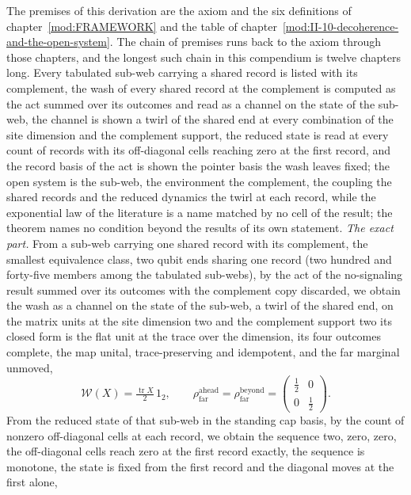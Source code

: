 \begin{chproof}
The premises of this derivation are the axiom and the six definitions of chapter~\ref{mod:FRAMEWORK} and the table of chapter~\ref{mod:II-10-decoherence-and-the-open-system}. The chain of premises runs back to the axiom through those chapters, and the longest such chain in this compendium is twelve chapters long.
Every tabulated sub-web carrying a shared record is listed with its complement, the wash of every shared record at the complement is computed as the act summed over its outcomes and read as a channel on the state of the sub-web, the channel is shown a twirl of the shared end at every combination of the site dimension and the complement support, the reduced state is read at every count of records with its off-diagonal cells reaching zero at the first record, and the record basis of the act is shown the pointer basis the wash leaves fixed; the open system is the sub-web, the environment the complement, the coupling the shared records and the reduced dynamics the twirl at each record, while the exponential law of the literature is a name matched by no cell of the result; the theorem names no condition beyond the results of its own statement.
\textit{The exact part.}
From a sub-web carrying one shared record with its complement, the smallest equivalence class, two qubit ends sharing one record (two hundred and forty-five members among the tabulated sub-webs), by the act of the no-signaling result summed over its outcomes with the complement copy discarded, we obtain the wash as a channel on the state of the sub-web, a twirl of the shared end, on the matrix units at the site dimension two and the complement support two its closed form is the flat unit at the trace over the dimension, its four outcomes complete, the map unital, trace-preserving and idempotent, and the far marginal unmoved,
\begin{equation}
\mathcal{W}(X) = \tfrac{\operatorname{tr} X}{2}\, 1_{2}, \qquad \rho_{\mathrm{far}}^{\mathrm{ahead}} = \rho_{\mathrm{far}}^{\mathrm{beyond}} = \begin{pmatrix} \tfrac{1}{2} & 0 \\ 0 & \tfrac{1}{2} \end{pmatrix} .
\end{equation}
From the reduced state of that sub-web in the standing cap basis, by the count of nonzero off-diagonal cells at each record, we obtain the sequence two, zero, zero, the off-diagonal cells reach zero at the first record exactly, the sequence is monotone, the state is fixed from the first record and the diagonal moves at the first alone,

\end{chproof}
